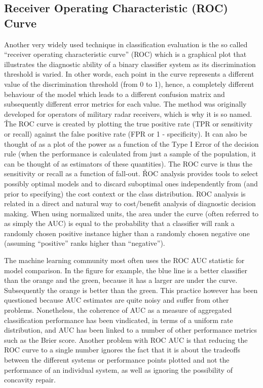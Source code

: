 \subsection{Receiver Operating Characteristic (ROC) Curve}

Another very widely used technique in classification evaluation is the so called ``receiver operating
characteristic curve'' (ROC) which is a graphical plot that illustrates the diagnostic ability of a binary classifier
system as its discrimination threshold is varied. In other words, each point in the curve represents a different
value of the discrimination threshold (from 0 to 1), hence, a completely different behaviour of the model which leads
to a different confusion matrix and subsequently different error metrics for each value. The method was originally
developed for operators of military radar receivers, which is why it is so named. \v

The ROC curve is created by plotting the true positive rate (TPR or sensitivity or recall) against the false positive
rate (FPR or 1 - specificity). It can also be thought of as a plot of the power as a function of the Type I Error of
the decision rule (when the performance is calculated from just a sample of the population, it can be thought of as
estimators of these quantities). The ROC curve is thus the sensitivity or recall as a function of fall-out. \v

ROC analysis provides tools to select possibly optimal models and to discard suboptimal ones independently from (and
prior to specifying) the cost context or the class distribution. ROC analysis is related in a direct and natural way
to cost/benefit analysis of diagnostic decision making. \v

When using normalized units, the area under the curve (often referred to as simply the AUC) is equal to the
probability that a classifier will rank a randomly chosen positive instance higher than a randomly chosen negative
one (assuming ``positive'' ranks higher than ``negative'').


The machine learning community most often uses the ROC AUC statistic for model comparison. In the figure for example,
the blue line is a better classifier than the orange and the green, because it has a larger are under the curve.
Subsequently the orange is better than the green. This practice however has been questioned because AUC estimates are
quite noisy and suffer from other problems. Nonetheless, the coherence of AUC as a measure of aggregated
classification performance has been vindicated, in terms of a uniform rate distribution, and AUC has been linked to a
number of other performance metrics such as the Brier score. Another problem with ROC AUC is that reducing the ROC
curve to a single number ignores the fact that it is about the tradeoffs between the different systems or performance
points plotted and not the performance of an individual system, as well as ignoring the possibility of concavity repair.

